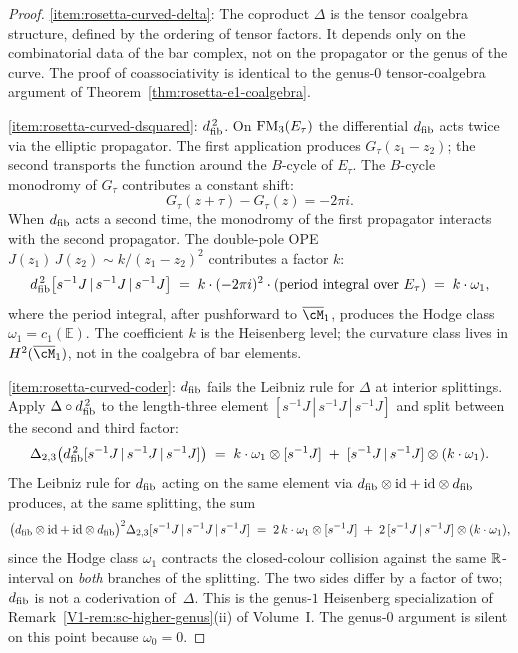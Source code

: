 \begin{proof}
\ref{item:rosetta-curved-delta}:
The coproduct $\Delta$ is the tensor coalgebra structure,
defined by the ordering of tensor factors. It depends only on
the combinatorial data of the bar complex, not on the
propagator or the genus of the curve. The proof of
coassociativity is identical to the genus-$0$ tensor-coalgebra
argument of Theorem~\ref{thm:rosetta-e1-coalgebra}.

\medskip
\ref{item:rosetta-curved-dsquared}: $d_{\mathrm{fib}}^{\,2}$.
On $\mathrm{FM}_3(E_\tau)$ the differential $d_{\mathrm{fib}}$ acts twice via the elliptic propagator. The first application produces $G_\tau(z_1 - z_2)$; the second transports the function around the $B$-cycle of $E_\tau$. The $B$-cycle monodromy of $G_\tau$ contributes a constant shift:
\begin{equation}\label{eq:rosetta-monodromy}
G_\tau(z + \tau) - G_\tau(z) = -2\pi i.
\end{equation}
When $d_{\mathrm{fib}}$ acts a second time, the monodromy of the first propagator interacts with the second propagator. The double-pole OPE $J(z_1)\, J(z_2) \sim k/(z_1 - z_2)^2$ contributes a factor $k$:
\begin{equation}\label{eq:rosetta-dsquared-computation}
d_{\mathrm{fib}}^{\,2}\bigl[s^{-1}J \,|\, s^{-1}J \,|\, s^{-1}J\bigr]
\;=\;
k \cdot (-2\pi i)^2 \cdot
\left(
 \text{period integral over } E_\tau
\right)
\;=\;
k \cdot \omega_1,
\end{equation}
where the period integral, after pushforward to $\overline{\cM}_1$, produces the Hodge class $\omega_1 = c_1(\mathbb{E})$. The coefficient $k$ is the Heisenberg level; the curvature class lives in $H^2(\overline{\cM}_1)$, not in the coalgebra of bar elements.

\medskip
\ref{item:rosetta-curved-coder}: $d_{\mathrm{fib}}$ fails the Leibniz rule for $\Delta$ at interior splittings. Apply $\Delta\circ d_{\mathrm{fib}}^{\,2}$ to the length-three element $[s^{-1}J\,|\,s^{-1}J\,|\,s^{-1}J]$ and split between the second and third factor:
\[
\Delta_{2{,}3}\bigl(d_{\mathrm{fib}}^{\,2}[s^{-1}J\,|\,s^{-1}J\,|\,s^{-1}J]\bigr)
\;=\;
k\cdot\omega_1\otimes [s^{-1}J]
\;+\;
[s^{-1}J\,|\,s^{-1}J]\otimes(k\cdot\omega_1).
\]
The Leibniz rule for $d_{\mathrm{fib}}$ acting on the same element via
$d_{\mathrm{fib}}\otimes\mathrm{id} + \mathrm{id}\otimes d_{\mathrm{fib}}$ produces, at the same
splitting, the sum
\[
\bigl(d_{\mathrm{fib}}\otimes\mathrm{id} + \mathrm{id}\otimes d_{\mathrm{fib}}\bigr)^{2}\Delta_{2{,}3}
[s^{-1}J\,|\,s^{-1}J\,|\,s^{-1}J]
\;=\;
2\,k\cdot\omega_1\otimes [s^{-1}J]
\;+\;
2\,[s^{-1}J\,|\,s^{-1}J]\otimes(k\cdot\omega_1),
\]
since the Hodge class $\omega_1$ contracts the closed-colour collision against the same $\mathbb{R}$-interval on \emph{both} branches of the splitting. The two sides differ by a factor of two; $d_{\mathrm{fib}}$ is not a coderivation of~$\Delta$. This is the genus-$1$ Heisenberg specialization of Remark~\ref{V1-rem:sc-higher-genus}\textup{(ii)} of Volume~I. The genus-$0$ argument is silent on this point because $\omega_0 = 0$.


\end{proof}
